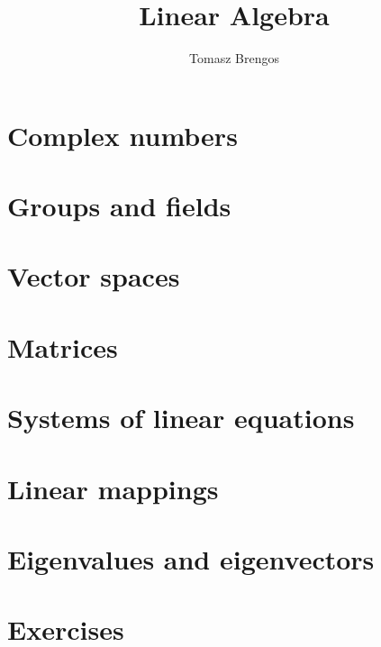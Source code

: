 \documentclass[10pt,a4paper,twoside,openany,parskip=half]{scrbook}
\title{\sffamily\bfseries Linear Algebra}
\author{\sffamily Tomasz Brengos}
\date{}
\theoremstyle{definition}
\theoremstyle{plain}
\theoremstyle{remark}
\theoremstyle{definition}
\newcommand{\0}{\mathbf{0}}
\begin{document}
\frontmatter
\maketitle
\tableofcontents

\mainmatter

\chapter{Complex numbers}\label{ch:complex}


\chapter{Groups and fields}\label{ch:groups-fields}


\chapter{Vector spaces}\label{ch:vector-spaces}


\chapter{Matrices}\label{ch:matrices}


\chapter{Systems of linear equations}\label{ch:sole}


\chapter{Linear mappings}\label{ch:linear-mappings}


\chapter{Eigenvalues and eigenvectors}\label{ch:eigen}


\renewcommand{\thechapter}{E}
\chapter{Exercises}\label{ch:exercises}

\end{document}
